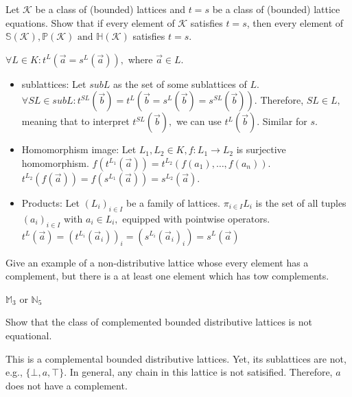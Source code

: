 \documentclass[11pt,a4paper]{exam}
\newcommand{\N}{\mathbb{N}}
\begin{document}
\begin{exo}
    Let $\mathcal{K}$ be a class of (bounded) lattices and $t = s$ be a class of (bounded) lattice equations. Show that if every element of $\mathcal{K}$ satisfies $t = s$, then every element of $\mathbb{S}(\mathcal{K}), \mathbb{P}(\mathcal{K}) \text{ and } \mathbb{H}(\mathcal{K})$ satisfies $t = s$.

    \begin{sol}
        $\forall L \in K \colon t^L(\overset{\rightarrow}{a} = s^L(\overset{\rightarrow}{a})),$ where $\overset{\rightarrow}{a} \in L$.
        \begin{itemize}
            \item sublattices: Let $subL$ as the set of some sublattices of $L$. $\forall SL \in subL \colon t^{SL}(\overset{\rightarrow}{b}) = t^L(\overset{\rightarrow}{b} = s^L(\overset{\rightarrow}{b}) = s^{SL}(\overset{\rightarrow}{b}))$. Therefore, $SL \in L,$ meaning that to interpret $t^{SL}(\overset{\rightarrow}{b}),$ we can use $t^{L}(\overset{\rightarrow}{b})$. Similar for $s$.
            \item Homomorphism image: Let $L_1, L_2 \in K, f \colon L_1 \rightarrow L_2$ is surjective homomorphism. $f(t^{L_1}(\overset{\rightarrow}{a})) = t^{L_2}(f(a_1), \dots, f(a_n))$. $t^{L_2}(f(\overset{\rightarrow}{a})) = f(s^{L_1}(\overset{\rightarrow}{a})) = s^{L_2}(\overset{\rightarrow}{a}).$
            \item Products: Let $(L_i)_{i \in I}$ be a family of lattices. $\pi_{i\in I}L_i$ is the set of all tuples $(a_i)_{i\in I}$ with $a_i \in L_i,$ equipped with pointwise operators. $t^L(\overset{\rightarrow}{a}) = (t^{L_i}(\overset{\rightarrow}{a}_i))_i = (s^{L_i}(\overset{\rightarrow}{a}_i)_i) = s^L(\overset{\rightarrow}{a})$
        \end{itemize}
    \end{sol}
\end{exo}

\begin{exo}
    Give an example of a non-distributive lattice whose every element has a complement, but there is a at least one element which has tow complements.

    \begin{sol}
        $\mathbb{M}_3 \text{ or } \N_5$
    \end{sol}
\end{exo}

\begin{exo}
    Show that the class of complemented bounded distributive lattices is not equational.

    \begin{sol}
        This is a complemental bounded distributive lattices. Yet, its sublattices are not, e.g., $\{\bot, a, \top\}$. In general, any chain in this lattice is not satisified. Therefore, $a$ does not have a complement.
    \end{sol}
\end{exo}
\end{document}
